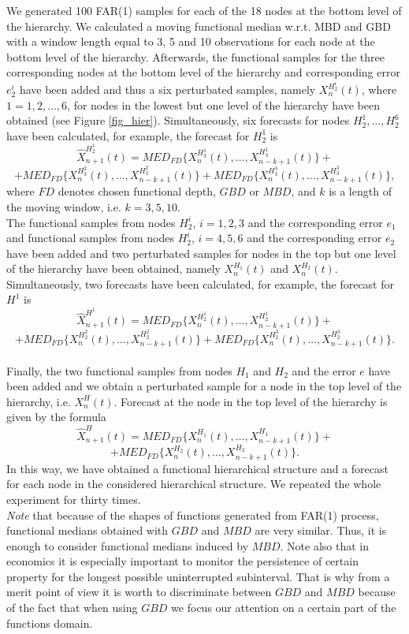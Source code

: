 \documentclass[12pt,a4paper]{article}
\numberwithin{equation}{section}
\begin{document}
We generated 100 FAR(1) samples for each of the 18 nodes at the bottom level of the hierarchy. We calculated a moving functional median w.r.t. MBD and GBD with a window length equal to 3, 5 and 10 observations for each node at the bottom level of the hierarchy. Afterwards, the functional samples for the three corresponding nodes at the bottom level of the hierarchy and corresponding error $e_2^i$ have been added and thus a six perturbated samples, namely $X^{H_2^i}_{n}(t)$, where $1=1,2,\dots,6$, for nodes in the lowest but one level of the hierarchy have been obtained (see Figure \ref{fig_hier}). Simultaneously, six forecasts for nodes $H_2^1,\dots,H_2^6$ have been calculated, for example, the forecast for $H_2^1$ is $$\hat{X}_{n+1}^{H_2^1}(t)=MED_{FD}\{X^{H_3^1}_{n}(t),\dots,X^{H_3^1}_{n-k+1}(t)\}+$$
$$+MED_{FD}\{X^{H_3^2}_{n}(t),\dots,X^{H_3^2}_{n-k+1}(t)\}+MED_{FD}\{X^{H_3^3}_{n}(t),\dots,X^{H_3^3}_{n-k+1}(t)\},$$
where $FD$ denotes chosen functional depth, $GBD$ or $MBD$, and $k$ is a length of the moving window, i.e. $k=3,5,10$. 
\\ The functional samples from nodes $H_2^i$, $i=1,2,3$ and the corresponding error $e_1$ and functional samples from nodes $H_2^i$, $i=4,5,6$ and the corresponding error $e_2$ have been added and two perturbated samples for nodes in the top but one level of the hierarchy have been obtained, namely $X^{H_1}_{n}(t)$ and $X^{H_2}_{n}(t)$.
Simultaneously, two forecasts have been calculated, for example, the forecast for $H^1$ is 
$$\hat{X}_{n+1}^{H^1}(t)=MED_{FD}\{X^{H_2^1}_{n}(t),\dots,X^{H_2^1}_{n-k+1}(t)\}+$$
$$+MED_{FD}\{X^{H_2^2}_{n}(t),\dots,X^{H_2^2}_{n-k+1}(t)\}+MED_{FD}\{X^{H_2^3}_{n}(t),\dots,X^{H_2^3}_{n-k+1}(t)\}.$$
\\ Finally, the two functional samples from nodes $H_1$ and $H_2$ and the error $e$ have been added and we obtain a perturbated sample for a node in the top level of the hierarchy, i.e. $X^H_n(t)$. Forecast at the node in the top level of the hierarchy is given by the formula
$$\hat{X}_{n+1}^{H}(t)=MED_{FD}\{X^{H_1}_{n}(t),\dots,X^{H_1}_{n-k+1}(t)\}+$$
$$+MED_{FD}\{X^{H_2}_{n}(t),\dots,X^{H_2}_{n-k+1}(t)\}.$$
In this way, we have obtained a functional hierarchical structure and a forecast for each node in the considered hierarchical structure. We repeated the whole experiment for thirty times.
\\ \emph{Note} that because of the shapes of functions generated from FAR(1) process, functional medians obtained with $GBD$ and $MBD$ are very similar. Thus, it is enough to consider functional medians induced by $MBD$. Note also that in economics it is especially important to monitor the persistence of certain property for the longest possible uninterrupted subinterval. That is why from a merit point of view it is worth to discriminate between $GBD$ and $MBD$ because of the fact that when using $GBD$ we focus our attention on a certain part of the functions domain. 
\end{document}
